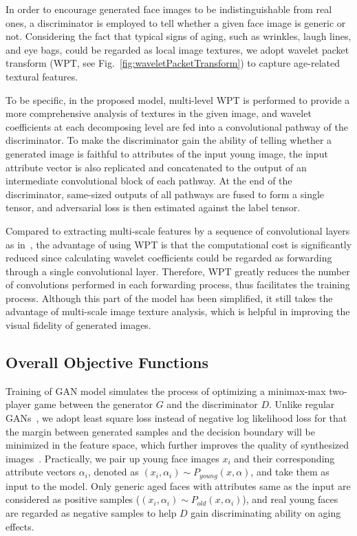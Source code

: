 \documentclass[letterpaper]{article} %
\begin{document}
In order to encourage generated face images to be indistinguishable from real ones, a discriminator is employed to tell whether a given face image is generic or not.
Considering the fact that typical signs of aging, such as wrinkles, laugh lines, and eye bags, could be regarded as local image textures, we adopt wavelet packet transform (WPT, see Fig.~\ref{fig:waveletPacketTransform}) to capture age-related textural features.

To be specific, in the proposed model, multi-level WPT is performed to provide a more comprehensive analysis of textures in the given image, and wavelet coefficients at each decomposing level are fed into a convolutional pathway of the discriminator. 
To make the discriminator gain the ability of telling whether a generated image is faithful to attributes of the input young image, the input attribute vector is also replicated and concatenated to the output of an intermediate convolutional block of each pathway.
At the end of the discriminator, same-sized outputs of all pathways are fused to form a single tensor, and adversarial loss is then estimated against the label tensor.

Compared to extracting multi-scale features by a sequence of convolutional layers as in~\cite{yang2017learning}, the advantage of using WPT is that the computational cost is significantly reduced since calculating wavelet coefficients could be regarded as forwarding through a single convolutional layer. 
Therefore, WPT greatly reduces the number of convolutions performed in each forwarding process, thus facilitates the training process. 
Although this part of the model has been simplified, it still takes the advantage of multi-scale image texture analysis, which is helpful in improving the visual fidelity of generated images. 

\subsection{Overall Objective Functions}

Training of GAN model simulates the process of optimizing a minimax-max two-player game between the generator $G$ and the discriminator $D$. 
Unlike regular GANs~\cite{goodfellow2014generative}, we adopt least square loss instead of negative log likelihood loss for that the margin between generated samples and the decision boundary will be minimized in the feature space, which further improves the quality of synthesized images~\cite{mao2017least}. 
Practically, we pair up young face images $x_i$ and their corresponding attribute vectors $\alpha_i$, denoted as $(x_i, \alpha_i)\sim P_{young}(x, \alpha)$, and take them as input to the model. 
Only generic aged faces with attributes same as the input are considered as positive samples ($(x_i, \alpha_i)\sim P_{old}(x, \alpha_i)$), and real young faces are regarded as negative samples to help $D$ gain discriminating ability on aging effects.
\end{document}
